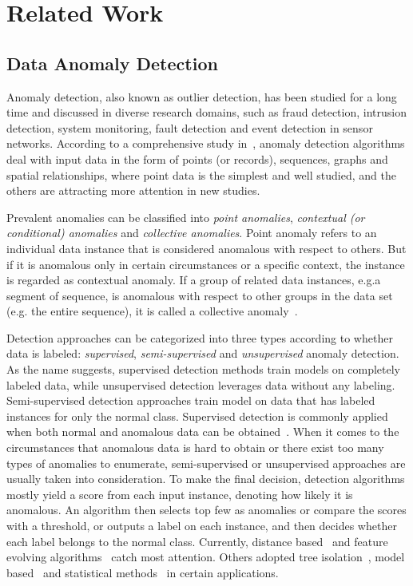 \documentclass[10pt,conference,letterpaper]{IEEEtran}
\begin{document}
	\section{Related Work}\label{sec:related-work}
		\subsection{Data Anomaly Detection}
			Anomaly detection, also known as outlier detection, has been studied for a long time and discussed in diverse research domains, such as fraud detection, intrusion detection, system monitoring, fault detection and event detection in sensor networks. According to a comprehensive study in~\cite{chandola2009anomaly}, anomaly detection algorithms deal with input data in the form of points (or records), sequences, graphs and spatial relationships, where point data is the simplest and well studied, and the others are attracting more attention in new studies.
	
			Prevalent anomalies can be classified into \textit{point anomalies}, \textit{contextual (or conditional) anomalies} and \textit{collective anomalies}. Point anomaly refers to an individual data instance that is considered anomalous with respect to others. But if it is anomalous only in certain circumstances or a specific context, the instance is regarded as contextual anomaly. If a group of related data instances, e.g.a segment of sequence, is anomalous with respect to other groups in the data set (e.g. the entire sequence), it is called a collective anomaly~\cite{goldberger2000components}.
			
			Detection approaches can be categorized into three types according to whether data is labeled: \textit{supervised}, \textit{semi-supervised} and \textit{unsupervised} anomaly detection. As the name suggests, supervised detection methods train models on completely labeled data, while unsupervised detection leverages data without any labeling. Semi-supervised detection approaches train model on data that has labeled instances for only the normal class. Supervised detection is commonly applied when both normal and anomalous data can be obtained~\cite{fujimaki2005approach}. When it comes to the circumstances that anomalous data is hard to obtain or there exist too many types of anomalies to enumerate, semi-supervised or unsupervised approaches are usually taken into consideration.
			To make the final decision, detection algorithms mostly yield a score from each input instance, denoting how likely it is anomalous. An algorithm then selects top few as anomalies or compare the scores with a threshold, or outputs a label on each instance, and then decides whether each label belongs to the normal class.
			Currently, distance based~\cite{cao2014scalable,cao2017multi} and feature evolving algorithms~\cite{masud2013classification,li2015discovery,shao2014prototype} catch most attention. Others adopted tree isolation~\cite{zhang2017lshiforest}, model based~\cite{yin2016model} and statistical methods~\cite{zhu2002statstream} in certain applications.
	
\end{document}
